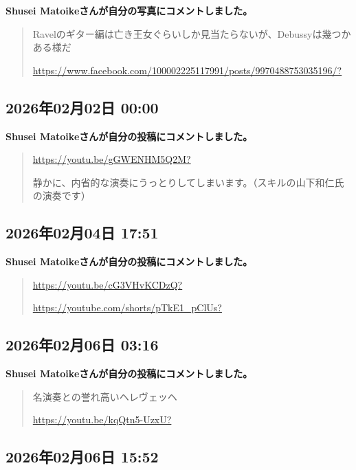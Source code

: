 \textbf{Shusei Matoikeさんが自分の写真にコメントしました。}

\begin{quote}
Ravelのギター編は亡き王女ぐらいしか見当たらないが、Debussyは幾つかある様だ

\url{https://www.facebook.com/100002225117991/posts/9970488753035196/?}
\end{quote}

\subsection*{2026年02月02日 00:00}

\textbf{Shusei Matoikeさんが自分の投稿にコメントしました。}

\begin{quote}
\url{https://youtu.be/gGWENHM5Q2M?}

静かに、内省的な演奏にうっとりしてしまいます。（スキルの山下和仁氏の演奏です）
\end{quote}

\subsection*{2026年02月04日 17:51}

\textbf{Shusei Matoikeさんが自分の投稿にコメントしました。}

\begin{quote}
\url{https://youtu.be/cG3VHvKCDzQ?}

\url{https://youtube.com/shorts/pTkE1_pClUs?}
\end{quote}

\subsection*{2026年02月06日 03:16}

\textbf{Shusei Matoikeさんが自分の投稿にコメントしました。}

\begin{quote}
名演奏との誉れ高いヘレヴェッヘ

\url{https://youtu.be/kqQtn5-UzxU?}
\end{quote}

\subsection*{2026年02月06日 15:52}

